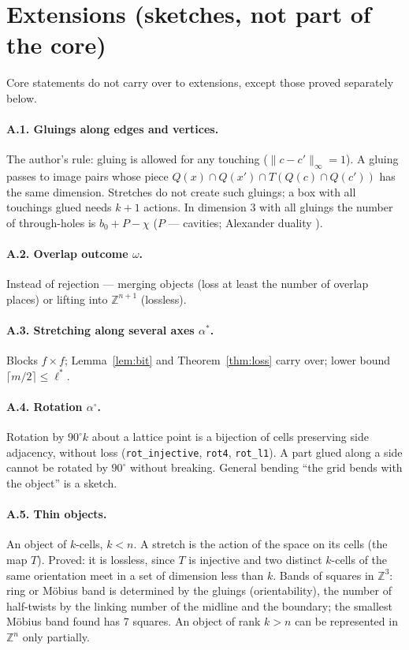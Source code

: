 \documentclass[11pt,a4paper]{article}
\theoremstyle{plain}
\theoremstyle{definition}
\theoremstyle{remark}
\newcommand{\Z}{\mathbb{Z}}
\newcommand{\lean}[1]{\texttt{#1}}
\begin{document}
\appendix
\section{Extensions (sketches, not part of the core)}

Core statements do not carry over to extensions, except those proved separately below.

\paragraph{A.1. Gluings along edges and vertices.} The author's rule: gluing is allowed for any touching ($\|c-c'\|_\infty=1$). A gluing passes to image pairs whose piece $Q(x)\cap Q(x')\cap T(Q(c)\cap Q(c'))$ has the same dimension. Stretches do not create such gluings; a box with all touchings glued needs $k+1$ actions. In dimension 3 with all gluings the number of through-holes is $b_0+P-\chi$ ($P$ — cavities; Alexander duality \cite{toriwaki}).

\paragraph{A.2. Overlap outcome $\omega$.} Instead of rejection — merging objects (loss at least the number of overlap places) or lifting into $\Z^{n+1}$ (lossless).

\paragraph{A.3. Stretching along several axes $\alpha^*$.} Blocks $f\times f$; Lemma~\ref{lem:bit} and Theorem~\ref{thm:loss} carry over; lower bound $\lceil m/2\rceil\le\ell^*$.

\paragraph{A.4. Rotation $\alpha^\circ$.} Rotation by $90^\circ k$ about a lattice point is a bijection of cells preserving side adjacency, without loss (\lean{rot\_injective}, \lean{rot4}, \lean{rot\_l1}). A part glued along a side cannot be rotated by $90^\circ$ without breaking. General bending ``the grid bends with the object'' is a sketch.

\paragraph{A.5. Thin objects.} An object of $k$-cells, $k<n$. A stretch is the action of the space on its cells (the map $T$). Proved: it is lossless, since $T$ is injective and two distinct $k$-cells of the same orientation meet in a set of dimension less than $k$. Bands of squares in $\Z^3$: ring or Möbius band is determined by the gluings (orientability), the number of half-twists by the linking number of the midline and the boundary; the smallest Möbius band found has 7 squares. An object of rank $k>n$ can be represented in $\Z^n$ only partially.
\end{document}
